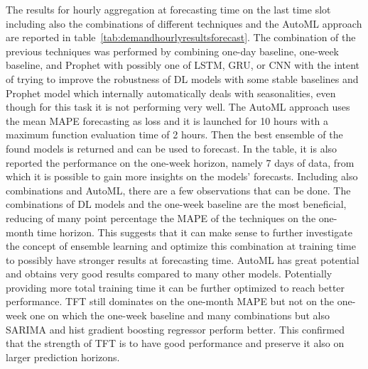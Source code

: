 The results for hourly aggregation at forecasting time on the last time slot including also the combinations of different techniques and the AutoML approach are reported in table~\ref{tab:demandhourlyresultsforecast}.
The combination of the previous techniques was performed by combining one-day baseline, one-week baseline, and Prophet with possibly one of LSTM, GRU, or CNN with the intent of trying to improve the robustness of DL models with some stable baselines and Prophet model which internally automatically deals with seasonalities, even though for this task it is not performing very well.
The AutoML approach uses the mean MAPE forecasting as loss and it is launched for 10 hours with a maximum function evaluation time of 2 hours.
Then the best ensemble of the found models is returned and can be used to forecast.
In the table, it is also reported the performance on the one-week horizon, namely 7 days of data, from which it is possible to gain more insights on the models' forecasts.
Including also combinations and AutoML, there are a few observations that can be done.
The combinations of DL models and the one-week baseline are the most beneficial, reducing of many point percentage the MAPE of the techniques on the one-month time horizon.
This suggests that it can make sense to further investigate the concept of ensemble learning and optimize this combination at training time to possibly have stronger results at forecasting time.
AutoML has great potential and obtains very good results compared to many other models.
Potentially providing more total training time it can be further optimized to reach better performance.
TFT still dominates on the one-month MAPE but not on the one-week one on which the one-week baseline and many combinations but also SARIMA and hist gradient boosting regressor perform better.
This confirmed that the strength of TFT is to have good performance and preserve it also on larger prediction horizons.

